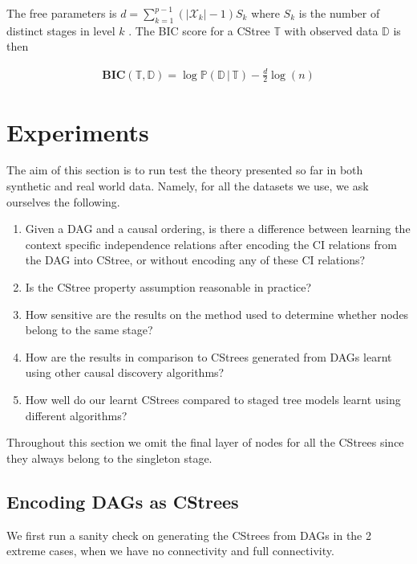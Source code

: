 \documentclass{tufte-book}
\begin{document}
\begin{Definition}
The free parameters is \(d=\sum_{k=1}^{p-1} (|\mathcal{X}_k| - 1)S_k\) where \(S_k\) is the number of distinct stages in level \(k\) \cite{duarte-2021-repres-learn}. The  BIC score for a CStree \(\mathbb{T}\) with observed data \(\mathbb{D}\) is then

\begin{align*}
\textbf{BIC}(\mathbb{T},\mathbb{D}) = \log\mathbb{P}(\mathbb{D}\,|\,\mathbb{T}) - \frac{d}{2}\log(n)
\end{align*}



\chapter{Experiments}
\label{sec:org1d1ace6}
The aim of this section is to run test the theory presented so far in both synthetic and real world data. Namely, for all the datasets we use, we ask ourselves the following.

\begin{enumerate}
\item Given a DAG and a causal ordering, is there a difference between learning the context specific independence relations after encoding the CI relations from the DAG into CStree, or without encoding any of these CI relations?
\item Is the CStree property assumption reasonable in practice?
\item How sensitive are the results on the method used to determine whether nodes belong to the same stage?
\item How are the results in comparison to CStrees generated from DAGs learnt using other causal discovery algorithms?
\item How well do our learnt CStrees compared to staged tree models learnt using different algorithms?
\end{enumerate}


Throughout this section we omit the final layer of nodes for all the CStrees since they always belong to the singleton stage.


\section{Encoding DAGs as CStrees}
\label{sec:orga46f571}
We first run a sanity check on generating the CStrees from DAGs in the 2 extreme cases, when we have no connectivity and full connectivity.


\end{Definition}
\end{document}
